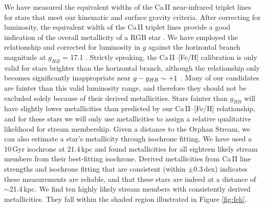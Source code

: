 \documentclass[10pt,apjl]{emulateapj}
\begin{document}
We have measured the equivalent widths of the Ca\,\textsc{II} near-infrared triplet lines for stars that meet our kinematic and surface gravity criteria. After correcting for luminosity, the equivalent width of the Ca\,\textsc{II} triplet lines provide a good indication of the overall metallicity of a RGB star \citep{Amandroff_Da_Costa_1991}. We have employed the \citet{Starkenburg_et-al_2010} relationship and corrected for luminosity in $g$ against the horizontal branch magnitude at $g_{HB}$ = 17.1 \citep{Newberg_et-al_2010}. Strictly speaking, the Ca\,\textsc{II}\---[Fe/H] calibration is only valid for stars brighter than the horizontal branch, although the relationship only becomes significantly inappropriate near $g \-- g_{HB} \sim +1$ \citep{Saviane_et-al_2012}. Many of our candidates are fainter than this valid luminosity range, and therefore they should not be excluded solely because of their derived metallicities. Stars fainter than $g_{HB}$ will have slightly lower metallicities than predicted by our Ca\,\textsc{II}\---[Fe/H] relationship, and for these stars we will only use metallicities to assign a relative qualitative likelihood for stream membership.
Given a distance to the Orphan Stream, we can also estimate a star's metallicity through isochrone fitting. We have used a 10\,Gyr \citet{Girardi_et-al_2008} isochrone at 21.4\,kpc \citep{Newberg_et-al_2010} and found metallicities for all eighteen likely stream members from their best-fitting isochrone. Derived metallicities from Ca\,\textsc{II} line strengths and isochrone fitting that are consistent (within $\pm0.3$\,dex) indicates these measurements are reliable, and that these stars are indeed at a distance of $\sim$21.4\,kpc. We find ten highly likely stream members with consistently derived metallicities. They fall within the shaded region illustrated in Figure \ref{fig:feh}. 
\end{document}
